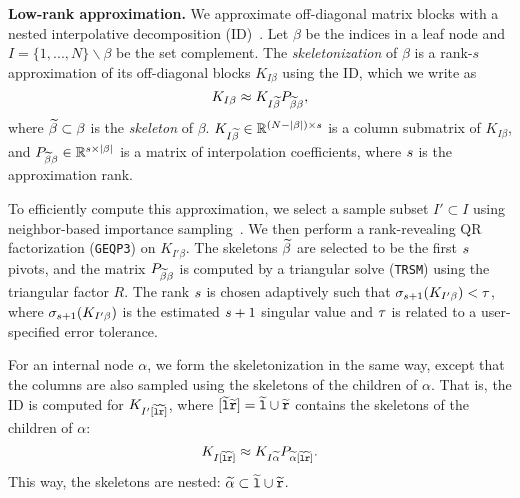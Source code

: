 \textbf{Low-rank approximation.}
We approximate off-diagonal matrix blocks with a nested
interpolative decomposition (ID)~\cite{halko-martinsson-tropp11}.
Let $\beta$ be the indices in a leaf node and
$I=\{1,...,N\}\backslash \beta$ be the set complement.
The \emph{skeletonization} of $\beta$ is a rank-$s$
approximation of its off-diagonal blocks $K_{I\beta}$ using the ID, 
which we write as
\begin{equation}
K_{I\beta} \approx K_{I{\widetilde{\beta}}}P_{{\widetilde{\beta}}\beta},
\end{equation}
where ${\widetilde{\beta}} \subset \beta$ is the \emph{skeleton} of $\beta$.
$K_{I{\widetilde{\beta}}} \in \mathbb{R}^{(N - \lvert \beta \rvert) \times s}$ is a column
submatrix of $K_{I \beta}$, and $P_{{\widetilde{\beta}}\beta} \in
\mathbb{R}^{s\times \lvert \beta \rvert}$ is a matrix of interpolation
coefficients, where ${s}$ is the approximation rank.

To efficiently compute this approximation, we select a sample subset $I'
\subset I$
using neighbor-based importance sampling~\cite{march-xiao-yu-biros-sisc16}. 
We then perform a rank-revealing QR factorization (\texttt{GEQP3}) on $K_{I' \beta}$.
The skeletons ${\widetilde{\beta}}$ are selected to be the first ${s}$ pivots, and
the matrix $P_{{\widetilde{\beta}}\beta}$ is computed by a triangular solve (\texttt{TRSM})
using the triangular factor $R$.
The rank ${s}$ is chosen adaptively such that $\sigma_{{s}+1}(K_{I' \beta}) < {\tau}$,
where $\sigma_{{s}+1}(K_{I' \beta})$ is the estimated ${s}+1$ singular value and
${\tau}$ is related to a user-specified error tolerance.

For an internal node $\alpha$, we form the skeletonization in the same way,
except that the columns are also sampled using the skeletons of the children of $\alpha$.
That is, the ID is computed for $K_{I'[{\widetilde{{\tt l}}}{\widetilde{{\tt r}}}]}$,
where $[{\widetilde{{\tt l}}}{\widetilde{{\tt r}}}] = {\widetilde{{\tt l}}} \cup {\widetilde{{\tt r}}}$ contains the skeletons of the children
of $\alpha$:
\begin{equation}
K_{I[{\widetilde{{\tt l}}}{\widetilde{{\tt r}}}]} \approx K_{I{\widetilde{\alpha}}}P_{{\widetilde{\alpha}}[{\widetilde{{\tt l}}}{\widetilde{{\tt r}}}]}.
\end{equation}
This way, the skeletons are nested:
${\widetilde{\alpha}} \subset {\widetilde{{\tt l}}} \cup {\widetilde{{\tt r}}}$.

